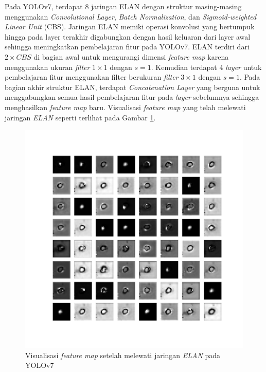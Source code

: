     Pada YOLOv7, terdapat 8 jaringan ELAN dengan struktur masing-masing menggunakan \textit{Convolutional Layer}, \textit{Batch Normalization}, dan \textit{Sigmoid-weighted Linear Unit} (CBS). Jaringan ELAN memiki operasi konvolusi yang bertumpuk hingga pada layer terakhir digabungkan dengan hasil keluaran dari layer awal sehingga meningkatkan pembelajaran fitur pada YOLOv7. ELAN terdiri dari $2\times CBS$ di bagian awal untuk mengurangi dimensi \textit{feature map} karena menggunakan ukuran \textit{filter} $1\times 1$ dengan $s = 1$. Kemudian terdapat 4 \textit{layer} untuk pembelajaran fitur menggunakan filter berukuran \textit{filter} $3\times 1$ dengan $s = 1$. Pada bagian akhir struktur ELAN, terdapat \textit{Concatenation Layer} yang berguna untuk menggabungkan semua hasil pembelajaran fitur pada \textit{layer} sebelumnya sehingga menghasilkan \textit{feature map} baru. Visualisasi \textit{feature map} yang telah melewati jaringan \textit{ELAN} seperti terlihat pada Gambar \ref{fig:d-elan}.

    \begin{figure}[H]
        \begin{center}
            \includegraphics[width=12cm]{img/bab4/elan-layer.png}
            \caption{Visualisasi \textit{feature map} setelah melewati jaringan \textit{ELAN} pada YOLOv7}
            \label{fig:d-elan}
        \end{center}
    \end{figure}

